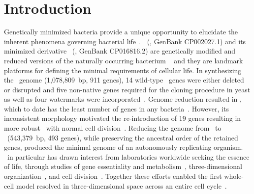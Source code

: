 \section{Introduction}



Genetically minimized bacteria provide a unique opportunity to elucidate the inherent phenomena governing bacterial life \citep{lachance_minimal_2019}.~\jsyn~(\syn, GenBank CP002027.1) and its minimized derivative \jsyna~(\syna, GenBank CP016816.2) are genetically modified and reduced versions of the naturally occurring bacterium \Mmy~\cite{gibson_creation_2010, hutchison_design_2016} and they are landmark platforms for defining the minimal requirements of cellular life.
In synthesizing the \syn~genome (1{,}078{,}809~bp, 911 genes), 14 wild-type \mmy~genes were either deleted or disrupted and five non-native genes required for the cloning procedure in yeast as well as four watermarks were incorporated~\cite{gibson_creation_2010}.
Genome reduction resulted in \synthreezero, which to date has the least number of genes in any bacteria~\cite{hutchison_design_2016}.
However, its inconsistent morphology motivated the re-introduction of 19 genes resulting in more robust \syna~with normal cell division~\cite{pelletier_genetic_2021, thornburg_bringing_2026}.
Reducing the genome from \syn~to \syna~(543{,}379~bp, 493 genes), while preserving the ancestral order of the retained genes, produced the minimal genome of an autonomously replicating organism.
\syna~in particular has drawn interest from laboratories worldwide seeking the essence of life, through studies of gene essentiality and metabolism~\cite{breuer_essential_2019}, three-dimensional organization~\cite{gilbert_generating_2021}, and cell division~\cite{pelletier_genetic_2021}.
Together these efforts enabled the first whole-cell model resolved in three-dimensional space across an entire cell cycle~\cite{thornburg_fundamental_2022, thornburg_bringing_2026}.


